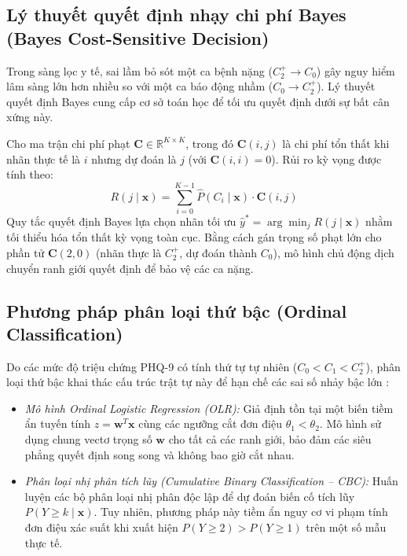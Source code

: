 \subsection{Lý thuyết quyết định nhạy chi phí Bayes (Bayes Cost-Sensitive Decision)}
\label{subsec:cost-sensitive-paradigm}

Trong sàng lọc y tế, sai lầm bỏ sót một ca bệnh nặng ($C_2^+ \to C_0$) gây nguy hiểm lâm sàng lớn hơn nhiều so với một ca báo động nhầm ($C_0 \to C_2^+$). Lý thuyết quyết định Bayes \cite{elkan2001foundations} cung cấp cơ sở toán học để tối ưu quyết định dưới sự bất cân xứng này.

Cho ma trận chi phí phạt $\mathbf{C} \in \mathbb{R}^{K \times K}$, trong đó $\mathbf{C}(i, j)$ là chi phí tổn thất khi nhãn thực tế là $i$ nhưng dự đoán là $j$ (với $\mathbf{C}(i, i) = 0$). Rủi ro kỳ vọng được tính theo:
\begin{equation}
    R(j \mid \mathbf{x}) = \sum_{i=0}^{K-1} \hat{P}(C_i \mid \mathbf{x}) \cdot \mathbf{C}(i, j)
\end{equation}
Quy tắc quyết định Bayes lựa chọn nhãn tối ưu $\hat{y}^* = \arg\min_j R(j \mid \mathbf{x})$ nhằm tối thiểu hóa tổn thất kỳ vọng toàn cục. Bằng cách gán trọng số phạt lớn cho phần tử $\mathbf{C}(2, 0)$ (nhãn thực là $C_2^+$, dự đoán thành $C_0$), mô hình chủ động dịch chuyển ranh giới quyết định để bảo vệ các ca nặng.

\subsection{Phương pháp phân loại thứ bậc (Ordinal Classification)}
\label{subsec:ordinal-paradigm}

Do các mức độ triệu chứng PHQ-9 có tính thứ tự tự nhiên ($C_0 < C_1 < C_2^+$), phân loại thứ bậc khai thác cấu trúc trật tự này để hạn chế các sai số nhảy bậc lớn \cite{mccullagh1980regression, frank2001simple}:
\begin{itemize}
    \item \textit{Mô hình Ordinal Logistic Regression (OLR):} Giả định tồn tại một biến tiềm ẩn tuyến tính $z = \mathbf{w}^T \mathbf{x}$ cùng các ngưỡng cắt đơn điệu $\theta_1 < \theta_2$. Mô hình sử dụng chung vectơ trọng số $\mathbf{w}$ cho tất cả các ranh giới, bảo đảm các siêu phẳng quyết định song song và không bao giờ cắt nhau.
    \item \textit{Phân loại nhị phân tích lũy (Cumulative Binary Classification -- CBC):} Huấn luyện các bộ phân loại nhị phân độc lập để dự đoán biến cố tích lũy $P(Y \ge k \mid \mathbf{x})$. Tuy nhiên, phương pháp này tiềm ẩn nguy cơ vi phạm tính đơn điệu xác suất khi xuất hiện $P(Y \ge 2) > P(Y \ge 1)$ trên một số mẫu thực tế.
\end{itemize}

